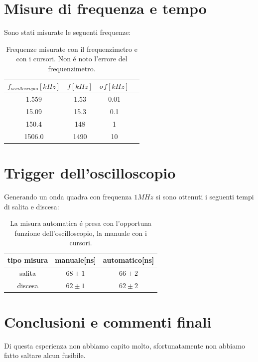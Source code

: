 \documentclass[10pt,a4paper]{article}
\begin{document}
\section{Misure di frequenza e tempo}
Sono stati misurate le seguenti frequenze:
\begin{table}[h]
\centering
\begin{tabular}{|c|c|c|c|}
\hline 
$f_{oscilloscopio}[kHz] $& $f[kHz]$ &$\sigma f [kHz]$ \\
\hline 
1.559 & 1.53 & 0.01 \\
15.09 & 15.3 & 0.1 \\
150.4 & 148 & 1 \\
1506.0 & 1490 & 10 \\

\hline 
\end{tabular} 
\caption{Frequenze misurate con il frequenzimetro e con i cursori. Non \'e noto l'errore del frequenzimetro.\label{t:par1}}
\end{table}

\section{Trigger dell'oscilloscopio}
Generando un onda quadra con frequenza $1 MHz$ si sono ottenuti i seguenti tempi di salita e discesa:


\begin{table}[h]
\centering
\begin{tabular}{|c|c|c|}
\hline 
tipo misura& manuale[ns] & automatico[ns] \\
\hline 
salita & $68 \pm 1$ & $66 \pm 2$ \\
discesa & $62 \pm 1$ & $62 \pm 2$\\

\hline 
\end{tabular} 
\caption{La misura automatica \'e presa con l'opportuna funzione dell'oscilloscopio, la manuale con i cursori. \label{t:par1}}
\end{table}
\section{Conclusioni e commenti finali}
Di questa esperienza non abbiamo capito molto, sfortunatamente non abbiamo fatto saltare alcun fusibile. 
\end{document}
